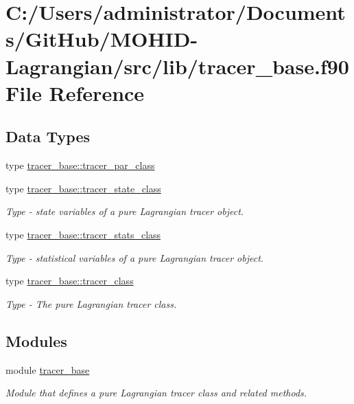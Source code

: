 \hypertarget{tracer__base_8f90}{}\section{C\+:/\+Users/administrator/\+Documents/\+Git\+Hub/\+M\+O\+H\+I\+D-\/\+Lagrangian/src/lib/tracer\+\_\+base.f90 File Reference}
\label{tracer__base_8f90}
\subsection*{Data Types}
\begin{DoxyCompactItemize}
\item 
type \mbox{\hyperlink{structtracer__base_1_1tracer__par__class}{tracer\+\_\+base\+::tracer\+\_\+par\+\_\+class}}
\item 
type \mbox{\hyperlink{structtracer__base_1_1tracer__state__class}{tracer\+\_\+base\+::tracer\+\_\+state\+\_\+class}}
\begin{DoxyCompactList}\small\item\em Type -\/ state variables of a pure Lagrangian tracer object. \end{DoxyCompactList}\item 
type \mbox{\hyperlink{structtracer__base_1_1tracer__stats__class}{tracer\+\_\+base\+::tracer\+\_\+stats\+\_\+class}}
\begin{DoxyCompactList}\small\item\em Type -\/ statistical variables of a pure Lagrangian tracer object. \end{DoxyCompactList}\item 
type \mbox{\hyperlink{structtracer__base_1_1tracer__class}{tracer\+\_\+base\+::tracer\+\_\+class}}
\begin{DoxyCompactList}\small\item\em Type -\/ The pure Lagrangian tracer class. \end{DoxyCompactList}\end{DoxyCompactItemize}
\subsection*{Modules}
\begin{DoxyCompactItemize}
\item 
module \mbox{\hyperlink{namespacetracer__base}{tracer\+\_\+base}}
\begin{DoxyCompactList}\small\item\em Module that defines a pure Lagrangian tracer class and related methods. \end{DoxyCompactList}\end{DoxyCompactItemize}

